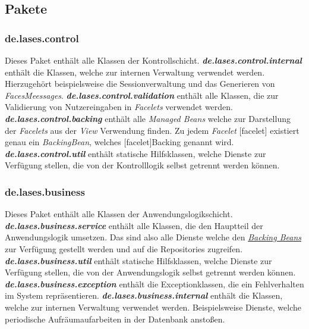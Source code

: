 \subsection{Pakete}\label{arch:pakete}

\subsubsection{de.lases.control} \label{arch:control}
Dieses Paket enthält alle Klassen der Kontrollschicht.
\newline\newline
\textbf{\emph{de.lases.control.internal}}
enthält die Klassen, welche zur internen Verwaltung verwendet werden.
Hierzugehört beispielsweise die Sessionverwaltung und das Generieren von \emph{FacesMeessages}.
\newline\newline
\textbf{\emph{de.lases.control.validation}}
enthält alle Klassen, die zur Validierung von Nutzereingaben
in \emph{Facelets} verwendet werden.
\newline\newline
\textbf{\emph{de.lases.control.backing}}\label{arch:backing}
enthält alle \emph{Managed Beans} welche zur Darstellung der \emph{Facelets} aus der
\emph{View} Verwendung finden. Zu jedem \emph{Facelet} [facelet] existiert genau ein
\emph{Backing\-Bean}, welches [facelet]Backing genannt wird.
\newline\newline
\textbf{\emph{de.lases.control.util}}
enthält statische Hilfsklassen, welche Dienste zur Verfügung stellen,
die von der Kontrolllogik selbst getrennt werden können.
\newline\newline

\subsubsection{de.lases.business}\label{arch:business}
Dieses Paket enthält alle Klassen der Anwendungslogikschicht.
\newline\newline
\textbf{\emph{de.lases.business.service}}\label{arch:service}
enthält alle Klassen, die den Hauptteil der Anwendungslogik umsetzen.
Das sind also alle Dienste welche den
\emph{\hyperref[arch:backing]{Backing Beans}} zur Verfügung
gestellt werden und auf die %
Repositories zugreifen.
\newline\newline
\textbf{\emph{de.lases.business.util}}
enthält statische Hilfsklassen, welche Dienste zur Verfügung stellen,
die von der Anwendungslogik selbst getrennt werden können.
\newline\newline
\textbf{\emph{de.lases.business.exception}} \label{arch:busex}
enthält die Exceptionklassen, die ein Fehlverhalten im System repräsentieren.
\newline\newline
\textbf{\emph{de.lases.business.internal}}
enthält die Klassen, welche zur internen Verwaltung verwendet werden.
Beispielsweise Dienste, welche periodische Aufräumaufarbeiten in der Datenbank anstoßen.

